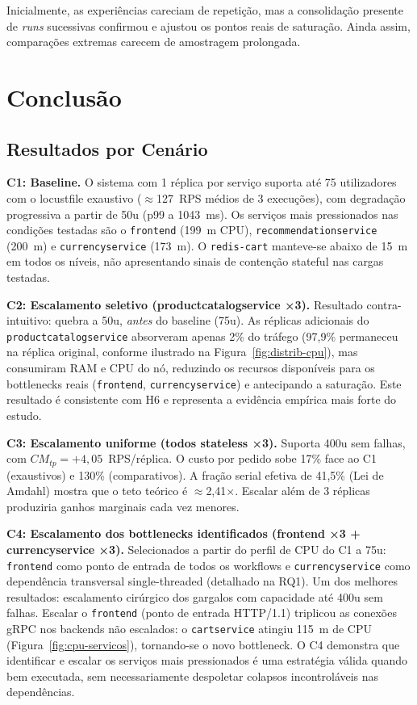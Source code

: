 \documentclass[manuscript,oneside]{acmart}
\begin{document}
Inicialmente, as experiências careciam de repetição, mas a consolidação presente de \textit{runs} sucessivas confirmou e ajustou os pontos reais de saturação. Ainda assim, comparações extremas carecem de amostragem prolongada.

\section{Conclusão}

\subsection{Resultados por Cenário}

\textbf{C1: Baseline.} O sistema com 1 réplica por serviço suporta até 75 utilizadores com o locustfile exaustivo ($\approx$127~RPS médios de 3 execuções), com degradação progressiva a partir de 50u (p99 a 1043~ms). Os serviços mais pressionados nas condições testadas são o \texttt{frontend} (199~m CPU), \texttt{recommendationservice} (200~m) e \texttt{currencyservice} (173~m). O \texttt{redis-cart} manteve-se abaixo de 15~m em todos os níveis, não apresentando sinais de contenção stateful nas cargas testadas.

\textbf{C2: Escalamento seletivo (productcatalogservice ×3).} Resultado contra-intuitivo: quebra a 50u, \emph{antes} do baseline (75u). As réplicas adicionais do \texttt{productcatalogservice} absorveram apenas 2\% do tráfego (97,9\% permaneceu na réplica original, conforme ilustrado na Figura~\ref{fig:distrib-cpu}), mas consumiram RAM e CPU do nó, reduzindo os recursos disponíveis para os bottlenecks reais (\texttt{frontend}, \texttt{currencyservice}) e antecipando a saturação. Este resultado é consistente com H6 e representa a evidência empírica mais forte do estudo.

\textbf{C3: Escalamento uniforme (todos stateless ×3).} Suporta 400u sem falhas, com $CM_{tp}=+4{,}05$~RPS/réplica. O custo por pedido sobe 17\% face ao C1 (exaustivos) e 130\% (comparativos). A fração serial efetiva de 41,5\% (Lei de Amdahl) mostra que o teto teórico é $\approx$2,41$\times$. Escalar além de 3 réplicas produziria ganhos marginais cada vez menores.

\textbf{C4: Escalamento dos bottlenecks identificados (frontend ×3 + currencyservice ×3).} Selecionados a partir do perfil de CPU do C1 a 75u: \texttt{frontend} como ponto de entrada de todos os workflows e \texttt{currencyservice} como dependência transversal single-threaded (detalhado na RQ1). Um dos melhores resultados: escalamento cirúrgico dos gargalos com capacidade até 400u sem falhas. Escalar o \texttt{frontend} (ponto de entrada HTTP/1.1) triplicou as conexões gRPC nos backends não escalados: o \texttt{cartservice} atingiu 115~m de CPU (Figura~\ref{fig:cpu-servicos}), tornando-se o novo bottleneck. O C4 demonstra que identificar e escalar os serviços mais pressionados é uma estratégia válida quando bem executada, sem necessariamente despoletar colapsos incontroláveis nas dependências.
\end{document}
